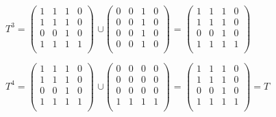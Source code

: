 \documentclass{article}
\begin{document}
\vspace{5mm}
\par
\hspace{8mm}
\hspace*{55mm}{k = 3, k - 1 = 2}
\vspace{5mm}
\par
\hspace{8mm} $T^3 =
	\begin{pmatrix}
		1 & 1 & 1 & 0 \\
		1 & 1 & 1 & 0 \\
		0 & 0 & 1 & 0 \\
		1 & 1 & 1 & 1 \\
	\end{pmatrix}$
$∪\begin{pmatrix}
		0 & 0 & 1 & 0 \\
		0 & 0 & 1 & 0 \\
		0 & 0 & 1 & 0 \\
		0 & 0 & 1 & 0 \\
	\end{pmatrix}$ =
$\begin{pmatrix}
		1 & 1 & 1 & 0 \\
		1 & 1 & 1 & 0 \\
		0 & 0 & 1 & 0 \\
		1 & 1 & 1 & 1 \\
	\end{pmatrix}$
\vspace{5mm}
\par
\hspace{8mm}
\hspace*{55mm}{k = 4, k - 1 = 3}
\vspace{5mm}
\par
\hspace{8mm} $T^4 =
	\begin{pmatrix}
		1 & 1 & 1 & 0 \\
		1 & 1 & 1 & 0 \\
		0 & 0 & 1 & 0 \\
		1 & 1 & 1 & 1 \\
	\end{pmatrix}$
$∪\begin{pmatrix}
		0 & 0 & 0 & 0 \\
		0 & 0 & 0 & 0 \\
		0 & 0 & 0 & 0 \\
		1 & 1 & 1 & 1 \\
	\end{pmatrix}$ =
$\begin{pmatrix}
		1 & 1 & 1 & 0 \\
		1 & 1 & 1 & 0 \\
		0 & 0 & 1 & 0 \\
		1 & 1 & 1 & 1 \\
	\end{pmatrix} = T$
\vspace{5mm}
\\
\end{document}
